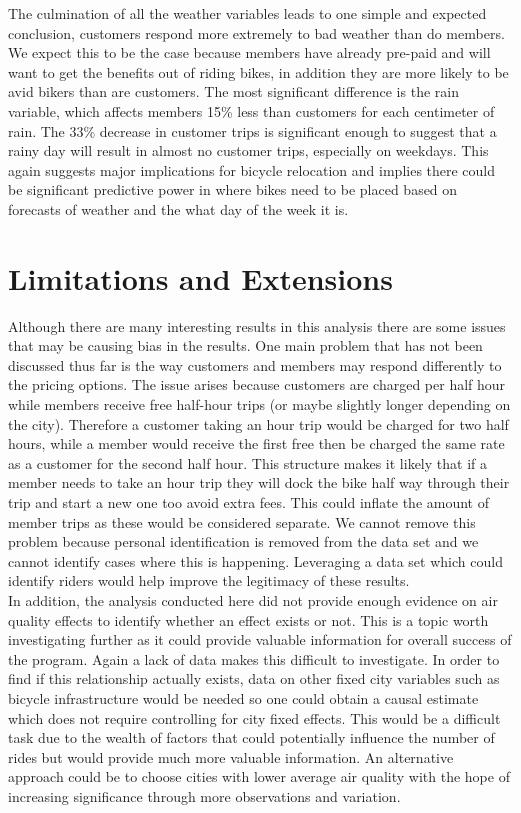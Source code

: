 \documentclass[12pt,letter paper]{article}
\begin{document}
The culmination of all the weather variables leads to one simple and expected conclusion, customers respond more extremely to bad weather than do members.  We expect this to be the case because members have already pre-paid and will want to get the benefits out of riding bikes, in addition they are more likely to be avid bikers than are customers.  The most significant difference is the rain variable, which affects members 15\% less than customers for each centimeter of rain.  The 33\% decrease in customer trips is significant enough to suggest that a rainy day will result in almost no customer trips, especially on weekdays.  This again suggests major implications for bicycle relocation and implies there could be significant predictive power in where bikes need to be placed based on forecasts of weather and the what day of the week it is.


\section{Limitations and Extensions}


Although there are many interesting results in this analysis there are some issues that may be causing bias in the results.  One main problem that has not been discussed thus far is the way customers and members may respond differently to the pricing options.  The issue arises because customers are charged per half hour while members receive free half-hour trips (or maybe slightly longer depending on the city).  Therefore a customer taking an hour trip would be charged for two half hours, while a member would receive the first free then be charged the same rate as a customer for the second half hour.  This structure makes it likely that if a member needs to take an hour trip they will dock the bike half way through their trip and start a new one too avoid extra fees.  This could inflate the amount of member trips as these would be considered separate.  We cannot remove this problem because personal identification is removed from the data set and we cannot identify cases where this is happening.  Leveraging a data set which could identify riders would help improve the legitimacy of these results. \\

In addition, the analysis conducted here did not provide enough evidence on air quality effects to identify whether an effect exists or not.  This is a topic worth investigating further as it could provide valuable information for overall success of the program.  Again a lack of data makes this difficult to investigate.  In order to find if this relationship actually exists, data on other fixed city variables such as bicycle infrastructure would be needed so one could obtain a causal estimate which does not require controlling for city fixed effects.  This would be a difficult task due to the wealth of factors that could potentially influence the number of rides but would provide much more valuable information.  An alternative approach could be to choose cities with lower average air quality with the hope of increasing significance through more observations and variation.  \\
\end{document}
